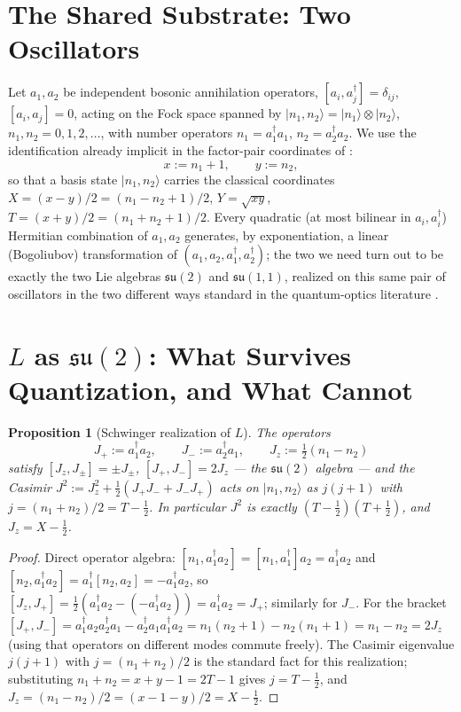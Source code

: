 \documentclass[11pt]{amsart}
\newtheorem{proposition}[theorem]{Proposition}
\theoremstyle{remark}
\begin{document}
\section{The Shared Substrate: Two Oscillators}

Let $a_1,a_2$ be independent bosonic annihilation operators, $[a_i,a_j^\dagger]=\delta_{ij}$, $[a_i,a_j]=0$, acting on the Fock space spanned by $|n_1,n_2\rangle=|n_1\rangle\otimes|n_2\rangle$, $n_1,n_2=0,1,2,\dots$, with number operators $n_1=a_1^\dagger a_1$, $n_2=a_2^\dagger a_2$. We use the identification already implicit in the factor-pair coordinates of \cite{Ebert2026Table,Ebert2026EigenCoord}:
\begin{equation}
x:=n_1+1,\qquad y:=n_2, \tag{2.1}
\end{equation}
so that a basis state $|n_1,n_2\rangle$ carries the classical coordinates $X=(x-y)/2=(n_1-n_2+1)/2$, $Y=\sqrt{xy}$, $T=(x+y)/2=(n_1+n_2+1)/2$. Every quadratic (at most bilinear in $a_i,a_i^\dagger$) Hermitian combination of $a_1,a_2$ generates, by exponentiation, a linear (Bogoliubov) transformation of $(a_1,a_2,a_1^\dagger,a_2^\dagger)$; the two we need turn out to be exactly the two Lie algebras $\mathfrak{su}(2)$ and $\mathfrak{su}(1,1)$, realized on this same pair of oscillators in the two different ways standard in the quantum-optics literature \cite{YurkeMcCallKlauder1986}.

\section{$L$ as $\mathfrak{su}(2)$: What Survives Quantization, and What Cannot}

\begin{proposition}[Schwinger realization of $L$]\label{prop:su2}
The operators
\[
J_+:=a_1^\dagger a_2,\qquad J_-:=a_2^\dagger a_1,\qquad J_z:=\tfrac12(n_1-n_2)
\]
satisfy $[J_z,J_\pm]=\pm J_\pm$, $[J_+,J_-]=2J_z$ --- the $\mathfrak{su}(2)$ algebra --- and the Casimir $J^2:=J_z^2+\tfrac12(J_+J_-+J_-J_+)$ acts on $|n_1,n_2\rangle$ as $j(j+1)$ with $j=(n_1+n_2)/2=T-\tfrac12$. In particular $J^2$ is exactly $(T-\tfrac12)(T+\tfrac12)$, and $J_z=X-\tfrac12$.
\end{proposition}

\begin{proof}
Direct operator algebra: $[n_1,a_1^\dagger a_2]=[n_1,a_1^\dagger]a_2=a_1^\dagger a_2$ and $[n_2,a_1^\dagger a_2]=a_1^\dagger[n_2,a_2]=-a_1^\dagger a_2$, so $[J_z,J_+]=\tfrac12(a_1^\dagger a_2-(-a_1^\dagger a_2))=a_1^\dagger a_2=J_+$; similarly for $J_-$. For the bracket $[J_+,J_-]=a_1^\dagger a_2a_2^\dagger a_1-a_2^\dagger a_1a_1^\dagger a_2=n_1(n_2+1)-n_2(n_1+1)=n_1-n_2=2J_z$ (using that operators on different modes commute freely). The Casimir eigenvalue $j(j+1)$ with $j=(n_1+n_2)/2$ is the standard fact for this realization; substituting $n_1+n_2=x+y-1=2T-1$ gives $j=T-\tfrac12$, and $J_z=(n_1-n_2)/2=(x-1-y)/2=X-\tfrac12$.
\end{proof}
\end{document}
